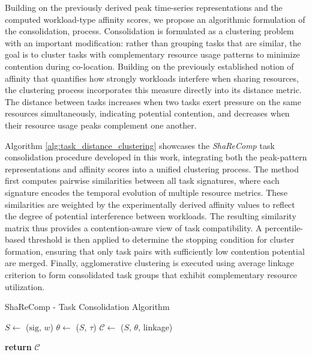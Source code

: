\label{sec:algorithmic_approach_consolidation}

Building on the previously derived peak time-series representations and the computed workload-type affinity scores, we propose an algorithmic formulation of the consolidation, process.
Consolidation is formulated as a clustering problem with an important modification: rather than grouping tasks that are similar, the goal is to cluster tasks with complementary resource usage patterns to minimize contention during co-location. Building on the previously established notion of affinity that quantifies how strongly workloads interfere when sharing resources, the clustering process incorporates this measure directly into its distance metric. The distance between tasks increases when two tasks exert pressure on the same resources simultaneously, indicating potential contention, and decreases when their resource usage peaks complement one another.

Algorithm \ref{alg:task_distance_clustering} showcases the \textit{ShaReComp} task consolidation procedure developed in this work, integrating both the peak-pattern representations and affinity scores into a unified clustering process. The method first computes pairwise similarities between all task signatures, where each signature encodes the temporal evolution of multiple resource metrics. These similarities are weighted by the experimentally derived affinity values to reflect the degree of potential interference between workloads. The resulting similarity matrix thus provides a contention-aware view of task compatibility.
A percentile-based threshold is then applied to determine the stopping condition for cluster formation, ensuring that only task pairs with sufficiently low contention potential are merged. Finally, agglomerative clustering is executed using average linkage criterion to form consolidated task groups that exhibit complementary resource utilization.

\begin{algorithm}[H]
    \caption{ShaReComp - Task Consolidation Algorithm}
    \label{alg:task_distance_clustering}


    $S \gets$ \Sim($\mathrm{sig}$, $w$) 
    $\theta \gets$ \Thresh($S$, $\tau$) 
    $\mathcal{C} \gets$ \Merge($S$, $\theta$, linkage) 

    \textbf{return } $\mathcal{C}$
\end{algorithm}

